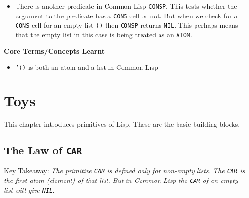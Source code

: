 \documentclass[11pt]{article}
\begin{document}
\begin{itemize}
\begin{verbatim}
(atom '())
» T

\end{verbatim}

We define our own predicate \texttt{ATOMP}

\begin{verbatim}
(defun atom? (x)
  (not (listp x)))

\end{verbatim}

So now \texttt{ATOMP} for our studies of this book will give \texttt{NIL} when tested for an empty list \texttt{'()}

\begin{verbatim}
(atom? '())
» NIL

\end{verbatim}

\item There is another predicate in Common Lisp \texttt{CONSP}. This tests whether the argument to the predicate has a \texttt{CONS}
cell or not. But when we check for a \texttt{CONS} cell for an empty list \texttt{()} then \texttt{CONSP} returns \texttt{NIL}. This perhaps
means that the empty list in this case is being treated as an \texttt{ATOM}.
\end{itemize}

\textbf{Core Terms/Concepts Learnt}
\begin{itemize}
\item \texttt{'()} is both an atom and a list in Common Lisp
\end{itemize}


\newpage
\section{Toys}
\label{sec:org1396b99}

This chapter introduces primitives of Lisp. These are the basic building blocks.

\vspace{1em}

\subsection{The Law of \texttt{CAR}}
\label{sec:org1d9fa4d}
Key Takeaway:
\emph{The primitive \texttt{CAR} is defined only for non-empty lists. The \texttt{CAR} is the first atom (element) of that list.}
\emph{But in Common Lisp the \texttt{CAR} of an empty list will give \texttt{NIL}.}
\end{document}
